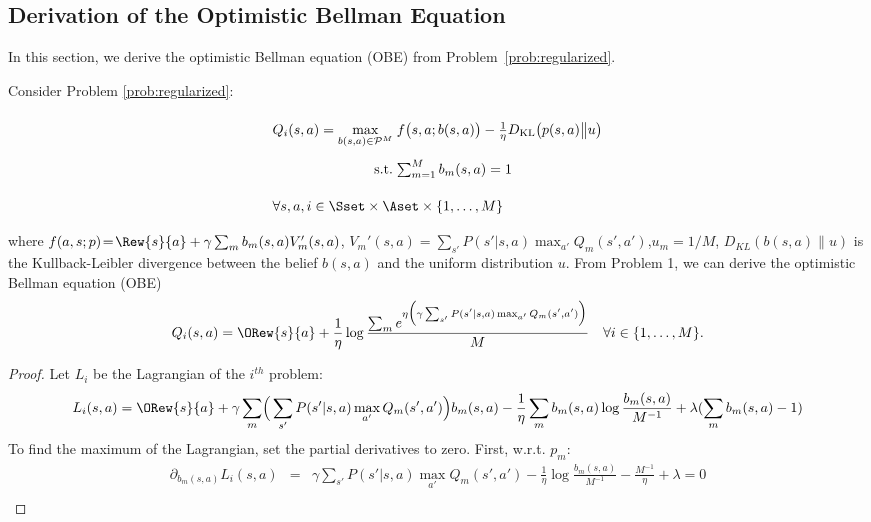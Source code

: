 \subsection{Derivation of the Optimistic Bellman Equation}
In this section, we derive the optimistic Bellman equation (OBE) from Problem~\ref{prob:regularized}. 
\label{A:derivation}
\begin{theorem}
	Consider Problem \ref{prob:regularized}:
	\begin{equation}
		\arraycolsep=1.4pt\def\arraystretch{2.2}
		\begin{array}{rrclcl}
	\displaystyle Q_i(s,a) = \max_{b(s,a) \in \mathcal{P}^M} & \multicolumn{3}{l}{f\big(s,a;b(s,a)\big)-\frac{1}{\eta}D_{\mathrm{KL}}\big(p(s,a)\big{\|}u\big) } \\
		\textrm{s.t.} & \sum_{m=1}^{M} b_m(s,a) & = & 1 \\
		\multicolumn{4}{l}{ \forall s,a,i \in \Sset \times \Aset \times \{1,\dots,M\}}
		\end{array}\nonumber
	\end{equation}
		where $f(a,s;p)\! =\! \Rew{s}{a} + \gamma \sum_m{b}_m(s,a)V_m'(s,a)$, $V_m'(s,a) \! = \! \sum_{s'} P(s'|s,a)\max_{a'}Q_m(s',a')$,$u_m  =  1/M$, $D_{KL}(b(s,a)\| u)$ is the Kullback-Leibler divergence between the belief $b(s,a)$ and the uniform distribution $u$.
		From Problem 1, we can derive the optimistic Bellman equation (OBE)
	\begin{equation}
		Q_i(s,a)  =   \ORew{s}{a}   + \frac{1}{\eta} \log \frac{ \sum_m e^{\eta \Bigr( \gamma  \sum_{s'}P(s'|s,a)\max_{a'}Q_m(s',a') \Bigl)} }{M}  \quad \forall i \in \{1, \dots, M\}. \nonumber 
	\end{equation}
	\begin{proof}
		Let $L_i$ be the Lagrangian of the $i^{th}$ problem:
		\begin{equation}
		L_i(s,a) = \ORew{s}{a}  + \gamma \sum_m \Bigr( \sum_{s'}P(s'|s,a)\max_{a'}Q_m(s',a') \Bigl) b_m(s,a) - \frac{1}{\eta} \sum_m b_m(s,a) \log \frac{b_m(s,a)}{M^{-1}} + \lambda(\sum_m b_m(s,a) - 1)
		\label{eq:langrangian_problem1}
		\end{equation}
		To find the maximum of the Lagrangian, set the partial derivatives to zero. First, w.r.t. $p_m$:
		\begin{eqnarray}
		\partial_{b_m(s,a)} L_i(s,a) &=& \gamma  \sum_{s'}P(s'|s,a)\max_{a'}Q_m(s',a') - \frac{1}{\eta} \log \frac{b_m(s,a)}{M^{-1}} - \frac{M^{-1}}{\eta} + \lambda = 0 \nonumber \\

\end{eqnarray}
\end{proof}
\end{theorem}
